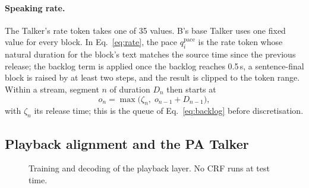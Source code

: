 \paragraph{Speaking rate.} The Talker's rate token takes one of 35 values. B's base Talker uses one fixed value for
every block. In Eq.~\eqref{eq:rate}, the pace $q^{\mathrm{pace}}_i$ is the rate token whose natural duration for the
block's text matches the source time since the previous release; the backlog term is applied once the backlog reaches
0.5\,s, a sentence-final block is raised by at least two steps, and the result is clipped to the token range. Within a
stream, segment $n$ of duration $D_n$ then starts at
\begin{equation}
o_n=\max\big(\zeta_n,\;o_{n-1}+D_{n-1}\big),
\label{eq:layout}
\end{equation}
with $\zeta_n$ its release time; this is the queue of Eq.~\eqref{eq:backlog} before discretisation.

\subsection{Playback alignment and the PA Talker}
\label{app:plem}
\label{app:train-pa}

\begin{figure}[h]
\small
{}
\caption{Training and decoding of the playback layer. No CRF runs at test time.}
\label{alg:pa}
\end{figure}


